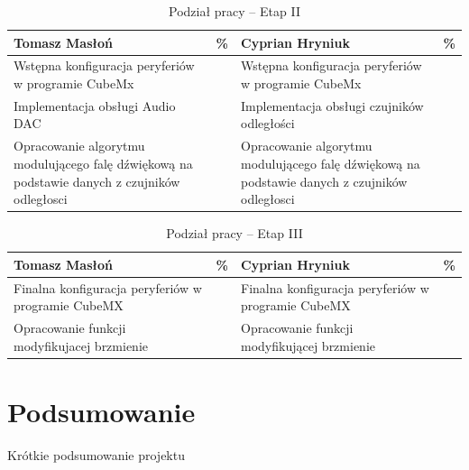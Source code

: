 \documentclass[10pt, a4paper]{article}
\begin{document}
\begin{table}[H]
	\centering
	\begin{tabular}{|L{7cm}|L{0.8cm}||L{7cm}|L{0.8cm}|}
		\hline
		\hline
		\textbf{Tomasz Masłoń} & 
		\% & 
		\textbf{Cyprian Hryniuk} & \%\\
		\hline
		\hline
		Wstępna konfiguracja peryferiów w programie CubeMx		& &	
		 	Wstępna konfiguracja peryferiów w programie CubeMx	&\\
		\hline
		Implementacja obsługi Audio DAC & &
		 	Implementacja obsługi czujników odległości&\\
		\hline
		Opracowanie algorytmu modulującego falę dźwiękową na podstawie danych z czujników odległosci & &
		Opracowanie algorytmu modulującego falę dźwiękową na podstawie danych z czujników odległosci & \\
		\hline
		\end{tabular}
	\caption{Podział pracy -- Etap II}
	\label{tab:PodzialPracyEtap2}
\end{table}

\begin{table}[H]
	\centering
	\begin{tabular}{|L{7cm}|L{0.8cm}||L{7cm}|L{0.8cm}|}
		\hline
		\hline
		\textbf{Tomasz Masłoń} & 
		\% & 
		\textbf{Cyprian Hryniuk} & \%\\
		\hline
		\hline
		Finalna konfiguracja peryferiów w programie CubeMX		& &	
		Finalna konfiguracja peryferiów w programie CubeMX &\\
		\hline
		Opracowanie funkcji modyfikujacej brzmienie  & &
		Opracowanie funkcji modyfikującej brzmienie &\\
		\hline	
	\end{tabular}
	\caption{Podział pracy -- Etap III}
	\label{tab:PodzialPracyEtap3}
\end{table}


\section{Podsumowanie}

Krótkie podsumowanie projektu

\newpage
{}


\end{document}
